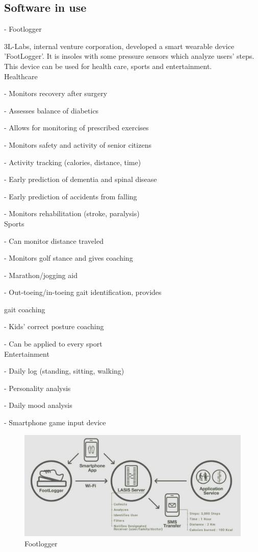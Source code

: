 \documentclass[conference]{IEEEtran}
\begin{document}
\subsection{Software in use}

-	Footlogger

3L-Labs, internal venture corporation, developed a smart wearable device 'FootLogger'. It is insoles with some pressure sensors which analyze users' steps. This device can be used for health care, sports and entertainment.\\

Healthcare

- Monitors recovery after surgery

- Assesses balance of diabetics

- Allows for monitoring of prescribed exercises 

- Monitors safety and activity of senior citizens

- Activity tracking (calories, distance, time)

- Early prediction of dementia and spinal disease

- Early prediction of accidents from falling

- Monitors rehabilitation (stroke, paralysis)\\

Sports

- Can monitor distance traveled

- Monitors golf stance and gives coaching

- Marathon/jogging aid

- Out-toeing/in-toeing gait identification, provides 

gait coaching
 
- Kids' correct posture coaching

- Can be applied to every sport\\

Entertainment

-  Daily log (standing, sitting, walking)

-  Personality analysis

-  Daily mood analysis

-  Smartphone game input device\\

\begin{figure}[H]
\begin{center}
    \includegraphics[scale=0.33]{img_05.jpg}
    \caption{Footlogger} 
\end{center}
\end{figure}
\end{document}
